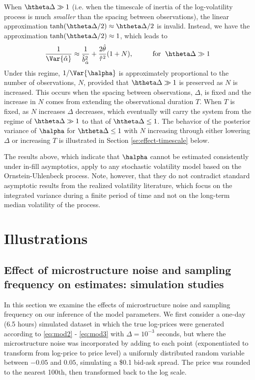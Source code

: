 When $\htheta \Delta \gg 1$ (i.e. when the timescale of inertia of the log-volatility process is much \textit{smaller} than the spacing between
observations), the linear approximation
$\tanh(\htheta \Delta/2) \approx \htheta \Delta/2$ is invalid. Instead, we have
the approximation $\tanh(\htheta \Delta/2) \approx 1 $, which leads to
$$ \frac{1}{\Var{\hat{\alpha}} } \approx \frac{1}{\hat{b}^2_{\hat{\alpha}} }+
\frac{2\hat{\theta} }{\hat{\tau}^2} (1 + N), \hspace*{1cm} \mbox{for }
\; \htheta \Delta \gg 1 $$
Under this regime, $1/\Var{\halpha}$ is approximately proportional to the number of observations, $N$, provided that $\htheta \Delta \gg 1$ is preserved as $N$ is increased.  This occurs when the spacing between observations, $\Delta $, is fixed and the increase in $N$ comes from extending the observational duration $T$.  When $T$ is fixed, as $N$ increases $\Delta $ decreases, which eventually will carry the system from the regime of $\htheta \Delta \gg 1$ to that of $\htheta \Delta \le 1$.  The behavior of the posterior variance of $\halpha$ for $\htheta \Delta \leq 1$ with $N$ increasing through either lowering $\Delta$ or increasing $T$ is illustrated in Section \ref{se:effect-timescale} below.

The results above, which indicate that $\halpha$ cannot be estimated consistently under in-fill asymptotics, apply to any stochastic volatility model based on the Ornstein-Uhlenbeck process.  Note, however, that they do not contradict standard asymptotic results from the realized volatility literature, which focus on the integrated variance during a finite period of time and not on the long-term median volatility of the process.

\section{Illustrations}\label{simulation-results}

\subsection{Effect of microstructure noise and sampling frequency on estimates: simulation studies}

In this section we examine the effects of microstructure noise and sampling frequency on our inference of the model parameters. We first consider a one-day (6.5 hours) simulated dataset in which the true log-prices were generated according to \eqref{eq:mod2} - \eqref{eq:mod3} with $\Delta = 10^{-3}$ seconds, but where the microstructure noise was incorporated by adding to each point (exponentiated to transform from log-price to price level) a uniformly distributed random variable between $-0.05$ and $0.05$, simulating a \$0.1 bid-ask spread. The price was rounded to the nearest 100th, then transformed back to the log scale.

